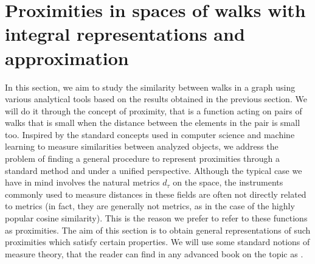 \documentclass[preprint,12pt]{elsarticle}
\begin{document}
\section{Proximities in spaces of walks with integral representations and approximation} \label{s4}
In this section, we aim to study the similarity between walks in a graph using various analytical tools based on the results obtained in the previous section. We will do it through the concept of proximity, that is a function acting on pairs of walks that is small when the distance between the elements in the pair  is small too.  Inspired by the standard concepts used in computer science and machine learning to measure similarities between analyzed objects, we address the problem of finding a general procedure to represent proximities through a standard method and under a unified perspective. Although the typical case we have in mind involves the natural metrics $d_\tau$ on the space, the instruments commonly used to measure distances in these fields are often not directly related to metrics (in fact, they are generally not metrics, as in the case of the highly popular cosine similarity). This is the reason we prefer to refer to these functions as proximities. The aim of this section is to obtain general representations of such proximities which satisfy certain properties. We will use some standard notions of measure theory, that the reader can find in any advanced book on the topic as
\cite{halmos}.




\end{document}
